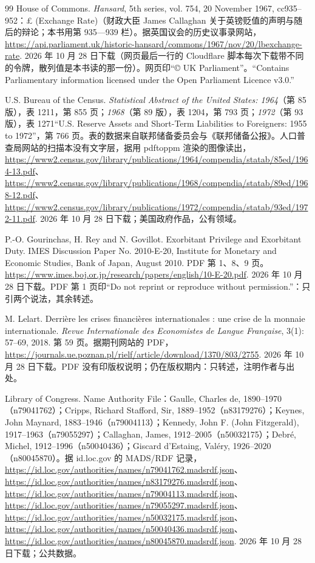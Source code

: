 \begin{thebibliography}{99}
 House of Commons. \emph{Hansard}, 5th series, vol. 754, 20 November 1967, cc935--952：\pounds{} (Exchange Rate)（财政大臣 James Callaghan 关于英镑贬值的声明与随后的辩论；本书用第 935—939 栏）。据英国议会的历史议事录网站，\url{https://api.parliament.uk/historic-hansard/commons/1967/nov/20/lbexchange-rate}. 2026 年 10 月 28 日下载（网页最后一行的 Cloudflare 脚本每次下载带不同的令牌，散列值是本书读的那一份）。网页印“© UK Parliament”。“Contains Parliamentary information licensed under the Open Parliament Licence v3.0.”

 U.S. Bureau of the Census. \emph{Statistical Abstract of the United States: 1964}（第 85 版），表 1211，第 855 页；\emph{1968}（第 89 版），表 1204，第 793 页；\emph{1972}（第 93 版），表 1271“U.S. Reserve Assets and Short-Term Liabilities to Foreigners: 1955 to 1972”，第 766 页。表的数据来自联邦储备委员会与《联邦储备公报》。人口普查局网站的扫描本没有文字层，据用 pdftoppm 渲染的图像读出，\url{https://www2.census.gov/library/publications/1964/compendia/statab/85ed/1964-13.pdf}、\url{https://www2.census.gov/library/publications/1968/compendia/statab/89ed/1968-12.pdf}、\url{https://www2.census.gov/library/publications/1972/compendia/statab/93ed/1972-11.pdf}. 2026 年 10 月 28 日下载；美国政府作品，公有领域。

 P.-O. Gourinchas, H. Rey and N. Govillot. Exorbitant Privilege and Exorbitant Duty. IMES Discussion Paper No. 2010-E-20, Institute for Monetary and Economic Studies, Bank of Japan, August 2010. PDF 第 1、8、9 页。\url{https://www.imes.boj.or.jp/research/papers/english/10-E-20.pdf}. 2026 年 10 月 28 日下载。PDF 第 1 页印“Do not reprint or reproduce without permission.”：只引两个说法，其余转述。

 M. Lelart. Derrière les crises financières internationales : une crise de la monnaie internationale. \emph{Revue Internationale des Economistes de Langue Française}, 3(1): 57--69, 2018. 第 59 页。据期刊网站的 PDF，\url{https://journals.ue.poznan.pl/rielf/article/download/1370/803/2755}. 2026 年 10 月 28 日下载。PDF 没有印版权说明；仍在版权期内：只转述，注明作者与出处。

 Library of Congress. Name Authority File：Gaulle, Charles de, 1890--1970（n79041762）；Cripps, Richard Stafford, Sir, 1889--1952（n83179276）；Keynes, John Maynard, 1883--1946（n79004113）；Kennedy, John F. (John Fitzgerald), 1917--1963（n79055297）；Callaghan, James, 1912--2005（n50032175）；Debré, Michel, 1912--1996（n50040436）；Giscard d'Estaing, Valéry, 1926--2020（n80045870）。据 id.loc.gov 的 MADS/RDF 记录，\url{https://id.loc.gov/authorities/names/n79041762.madsrdf.json}、\url{https://id.loc.gov/authorities/names/n83179276.madsrdf.json}、\url{https://id.loc.gov/authorities/names/n79004113.madsrdf.json}、\url{https://id.loc.gov/authorities/names/n79055297.madsrdf.json}、\url{https://id.loc.gov/authorities/names/n50032175.madsrdf.json}、\url{https://id.loc.gov/authorities/names/n50040436.madsrdf.json}、\url{https://id.loc.gov/authorities/names/n80045870.madsrdf.json}. 2026 年 10 月 28 日下载；公共数据。


\end{thebibliography}
